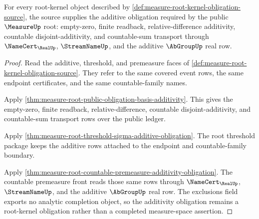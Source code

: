 \begin{theorem}
\label{thm:measure-root-kernel-additivity-obligation}
For every root-kernel object described by
\autoref{def:measure-root-kernel-obligation-source}, the source supplies the
additive obligation required by the public $\MeasureUp$ root: empty-zero,
finite readback, relative-difference additivity, countable
disjoint-additivity, and countable-sum transport through
$\NameCert_{\RealUp}$, $\StreamNameUp$, and the additive $\AbGroupUp$ real
row.
\end{theorem}
\begin{proof}
Read the additive, threshold, and premeasure faces of
\autoref{def:measure-root-kernel-obligation-source}. They refer to the same
covered event rows, the same endpoint certificates, and the same
countable-family names.

Apply \autoref{thm:measure-root-public-obligation-basis-additivity}. This
gives the empty-zero, finite readback, relative-difference, countable
disjoint-additivity, and countable-sum transport rows over the public
ledger.

Apply \autoref{thm:measure-root-threshold-sigma-additive-obligation}. The
root threshold package keeps the additive rows attached to the endpoint and
countable-family boundary.

Apply \autoref{thm:measure-root-countable-premeasure-additivity-obligation}.
The countable premeasure front reads those same rows through
$\NameCert_{\RealUp}$, $\StreamNameUp$, and the additive $\AbGroupUp$ real
row. The exclusions field exports no analytic completion object, so the
additivity obligation remains a root-kernel obligation rather than a
completed measure-space assertion.
\end{proof}

